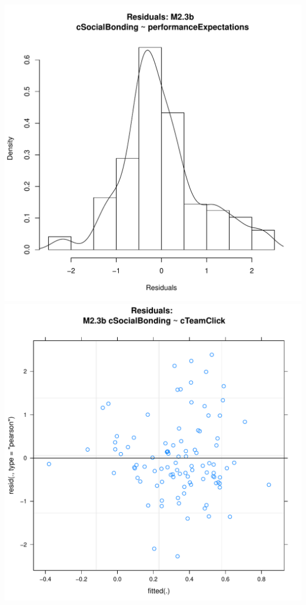 \documentclass[12pt]{report}
\begin{document}
\newpage
\centering


\newpage
\centering
\includegraphics[scale =.4]{../images/MLM23bHist.pdf}
\includegraphics[scale =.4]{../images/MLM23bScatter.pdf}
\end{document}
